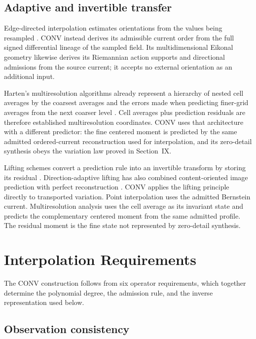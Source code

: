 \documentclass[journal]{IEEEtran}
\begin{document}
\subsection{Adaptive and invertible transfer}

Edge-directed interpolation estimates orientations from the values being
resampled \cite{li2001,lottes2021}. CONV instead derives its admissible
current order from the full signed differential lineage of the sampled
field. Its multidimensional Eikonal geometry likewise derives its Riemannian
action supports and directional admissions from the source current; it
accepts no external orientation as an additional input.

Harten's multiresolution algorithms already represent a hierarchy of nested
cell averages by the coarsest averages and the errors made when predicting
finer-grid averages from the next coarser level \cite{harten1995}. Cell
averages plus prediction residuals are therefore established multiresolution
coordinates. CONV uses that architecture with a different predictor: the
fine centered moment is predicted by the same admitted ordered-current
reconstruction used for interpolation, and its zero-detail synthesis obeys
the variation law proved in Section~IX.

Lifting schemes convert a prediction rule into an invertible transform by
storing its residual \cite{sweldens1998}. Direction-adaptive lifting has also
combined content-oriented image prediction with perfect reconstruction
\cite{ding2007}. CONV applies the lifting principle directly to transported
variation. Point interpolation uses the admitted Bernstein current.
Multiresolution analysis uses the cell average as its invariant state and
predicts the complementary centered moment from the same admitted profile.
The residual moment is the fine state not represented by zero-detail
synthesis.

\section{Interpolation Requirements}

The CONV construction follows from six operator requirements, which together
determine the polynomial degree, the admission rule, and the inverse
representation used below.

\subsection{Observation consistency}
\end{document}
